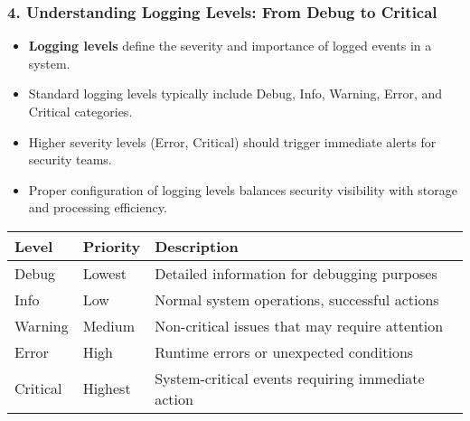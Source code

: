 \documentclass{beamer}
\begin{document}
	\begin{frame}
		\frametitle{4. Understanding Logging Levels: From Debug to Critical}
		\begin{itemize}
			\item \textbf{Logging levels} define the severity and importance of logged events in a system.
			\item Standard logging levels typically include Debug, Info, Warning, Error, and Critical categories.
			\item Higher severity levels (Error, Critical) should trigger immediate alerts for security teams.
			\item Proper configuration of logging levels balances security visibility with storage and processing efficiency.
		\end{itemize}
		
		\begin{table}
			\scriptsize
			\begin{tabular}{|l|l|p{6cm}|}
				\hline
				\textbf{Level} & \textbf{Priority} & \textbf{Description} \\
				\hline
				Debug & Lowest & Detailed information for debugging purposes \\
				\hline
				Info & Low & Normal system operations, successful actions \\
				\hline
				Warning & Medium & Non-critical issues that may require attention \\
				\hline
				Error & High & Runtime errors or unexpected conditions \\
				\hline
				Critical & Highest & System-critical events requiring immediate action \\
				\hline
			\end{tabular}
		\end{table}
	\end{frame}
	
\end{document}
